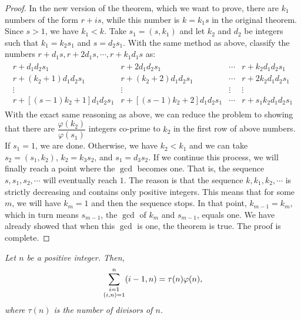 \documentclass[12pt]{subfile}
\begin{document}
\begin{proof}
			In the new version of the theorem, which we want to prove, there are $k_1$ numbers of the form $r+is$, while this number is $k=k_1s$ in the original theorem. Since $s>1$, we have $k_1<k$. Take $s_1 = (s,k_1)$ and let $k_2$ and $d_2$ be integers such that $k_1 = k_2s_1$ and $s=d_2s_1$. With the same method as above, classify the numbers $r+d_1s, r+2d_1s, \cdots, r+k_1d_1s$ as:
				\begin{align*}
					\begin{matrix}
						r+d_1d_2s_1&r+2d_1d_2s_1&\cdots&r+k_2d_1d_2s_1\\
						r+(k_2+1)d_1d_2s_1&r+(k_2+2)d_1d_2s_1&\cdots&r+2k_2d_1d_2s_1\\
						\vdots&\vdots&\vdots&\vdots\\
						r+[(s-1)k_2+1]d_1d_2s_1&r+[(s-1)k_2+2]d_1d_2s_1&\cdots&r+s_1k_2d_1d_2s_1
					\end{matrix}
				\end{align*}
			With the exact same reasoning as above, we can reduce the problem to showing that there are $\dfrac{\varphi(k_2)}{\varphi(s_1)}$ integers co-prime to $k_2$ in the first row of above numbers. If $s_1=1$, we are done. Otherwise, we have $k_2<k_1$ and we can take $s_2=(s_1,k_2)$, $k_2=k_3s_2$, and $s_1=d_3s_2$. If we continue this process, we will finally reach a point where the $\gcd$ becomes one. That is, the sequence $s, s_1, s_2, \cdots$ will eventually reach $1$. The reason is that the sequence $k, k_1, k_2, \cdots$ is strictly decreasing and contains only positive integers. This means that for some $m$, we will have $k_m=1$ and then the sequence stops. In that point, $k_{m-1} = k_m$, which in turn means $s_{m-1}$, the $\gcd$ of $k_{m}$ and $s_{m-1}$, equals one. We have already showed that when this $\gcd$ is one, the theorem is true. The proof is complete.
		\end{proof}
		
		\begin{theorem}\slshape
			Let $n$ be a positive integer. Then,
				\begin{align*}
					\sum_{\substack{i=1\\(i,n)=1}}^{n}(i-1,n)=\tau(n)\varphi (n),
				\end{align*}
			where $\tau(n)$ is the number of divisors of $n$.
		\end{theorem}
		
\end{document}
